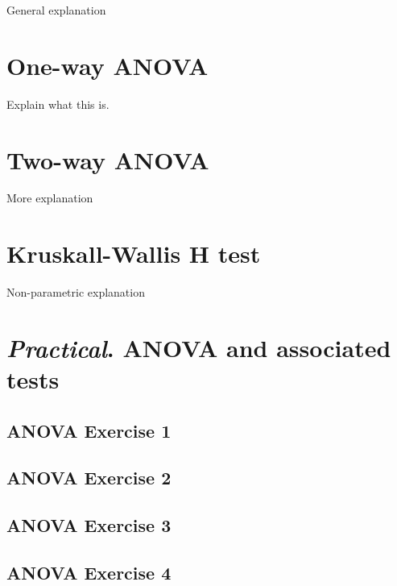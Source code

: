 \documentclass[
]{scrbook}
\begin{document}
General explanation

\hypertarget{one-way-anova}{%
\chapter{One-way ANOVA}\label{one-way-anova}}

Explain what this is.

\hypertarget{two-way-anova}{%
\chapter{Two-way ANOVA}\label{two-way-anova}}

More explanation

\hypertarget{kruskall-wallis-h-test}{%
\chapter{Kruskall-Wallis H test}\label{kruskall-wallis-h-test}}

Non-parametric explanation

\hypertarget{practical.-anova-and-associated-tests}{%
\chapter{\texorpdfstring{\emph{Practical}. ANOVA and associated tests}{Practical. ANOVA and associated tests}}\label{practical.-anova-and-associated-tests}}

\hypertarget{anova-exercise-1}{%
\section{ANOVA Exercise 1}\label{anova-exercise-1}}

\hypertarget{anova-exercise-2}{%
\section{ANOVA Exercise 2}\label{anova-exercise-2}}

\hypertarget{anova-exercise-3}{%
\section{ANOVA Exercise 3}\label{anova-exercise-3}}

\hypertarget{anova-exercise-4}{%
\section{ANOVA Exercise 4}\label{anova-exercise-4}}
\end{document}
